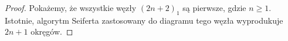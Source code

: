 \begin{proof}
    Pokażemy, że wszystkie węzły $(2n+2)_1$ są pierwsze, gdzie $n \ge 1$.
    Istotnie, algorytm Seiferta zastosowany do diagramu tego węzła wyprodukuje $2n+1$ okręgów.

\end{proof}

